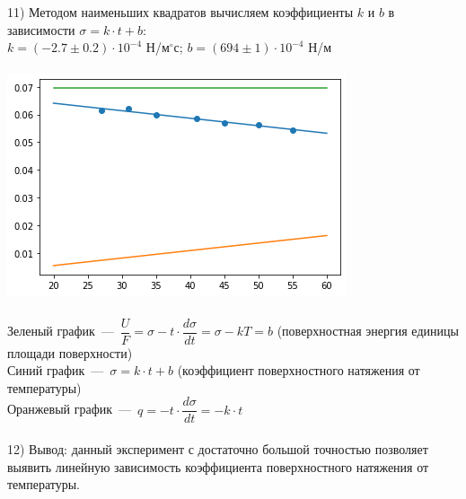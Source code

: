 \documentclass[12pt,a4paper,fleqn]{article}
\begin{document}
    11) Методом наименьших квадратов вычисляем коэффициенты $k$ и $b$ в зависимости $\sigma = k \cdot t + b$: \\
    $k = (-2.7 \pm 0.2) \cdot 10^{-4}$ Н/м$^{\circ}$с; $b = (694 \pm 1) \cdot 10^{-4}$ Н/м \\\\
    \includegraphics[scale=0.8]{загруженное.png}\\\\
    Зеленый график~---~$\dfrac{U}{F} = \sigma - t \cdot \dfrac{d \sigma}{dt} = \sigma - kT = b$ (поверхностная энергия единицы площади поверхности)\\
    Синий график~---~$\sigma = k \cdot t + b$ (коэффициент поверхностного натяжения от температуры) \\ 
    Оранжевый график~---~$q = -t \cdot \dfrac{d \sigma}{dt} = -k \cdot t$ \\\\
    12) Вывод: данный эксперимент с достаточно большой точностью позволяет выявить линейную зависимость коэффициента поверхностного натяжения от температуры.
\end{document}
